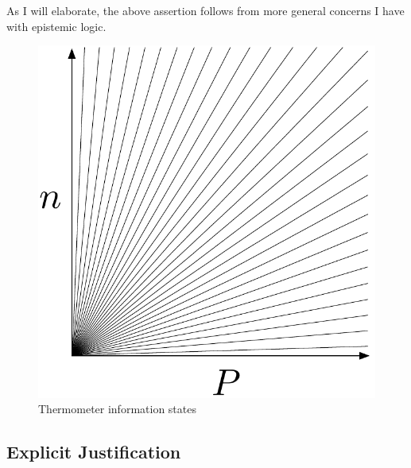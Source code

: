 \documentclass[11pt]{article}
\numberwithin{equation}{subsection}
\begin{document}
As I will elaborate, the above assertion follows from more general concerns I have with epistemic logic.

\begin{figure}[ht]
\begin{center}
\includegraphics[scale=.5]{therm.pdf} 
\end{center}
\caption{Thermometer information states}
\label{fig:therm2}
\end{figure}
\subsection{Explicit Justification}\label{explicit}
\end{document}
